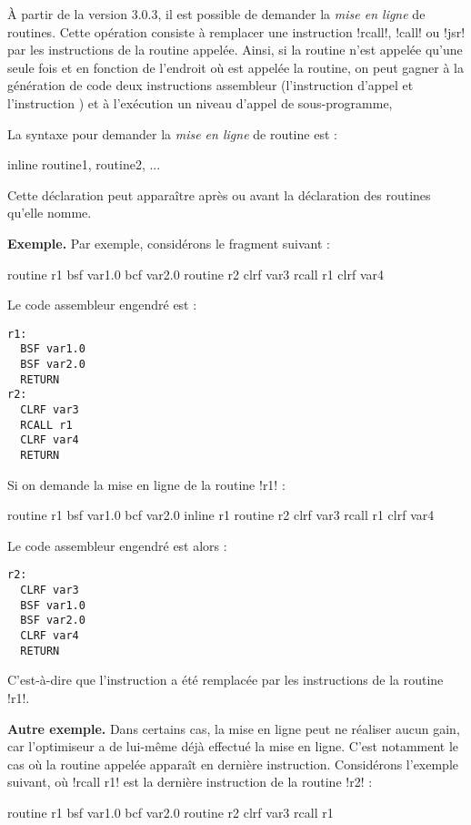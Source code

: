 
À partir de la version 3.0.3, il est possible de demander la \emph{mise en ligne} de routines. Cette opération consiste à remplacer une instruction \pic!rcall!, \pic!call! ou \pic!jsr! par les instructions de la routine appelée. Ainsi, si la routine n'est appelée qu'une seule fois et en fonction de l'endroit où est appelée la routine, on peut gagner à la génération de code deux instructions assembleur (l'instruction d'appel et l'instruction ) et à l'exécution un niveau d'appel de sous-programme, 

La syntaxe pour demander la \emph{mise en ligne} de routine est :
\begin{piccolo}
inline routine1, routine2, ...
\end{piccolo}

Cette déclaration peut apparaître après ou avant la déclaration des routines qu'elle nomme.

\textbf{Exemple.} Par exemple, considérons le fragment suivant :
\begin{piccolo}
routine r1 {
  bsf var1.0
  bcf var2.0
}
routine r2 {
  clrf var3
  rcall r1
  clrf var4
}
\end{piccolo}

Le code assembleur engendré est :
\begin{lstlisting}[language=assembleur]
r1:
  BSF var1.0
  BSF var2.0
  RETURN
r2:
  CLRF var3
  RCALL r1
  CLRF var4
  RETURN
\end{lstlisting}


Si on demande la mise en ligne de la routine \pic!r1! :
\begin{piccolo}
routine r1 {
  bsf var1.0
  bcf var2.0
}
inline r1
routine r2 {
  clrf var3
  rcall r1
  clrf var4
}
\end{piccolo}

Le code assembleur engendré est alors :
\begin{lstlisting}[language=assembleur]
r2:
  CLRF var3
  BSF var1.0
  BSF var2.0
  CLRF var4
  RETURN
\end{lstlisting}

C'est-à-dire que l'instruction  a été remplacée par les instructions de la routine \pic!r1!.

\textbf{Autre exemple.} Dans certains cas, la mise en ligne peut ne réaliser aucun gain, car l'optimiseur a de lui-même déjà effectué la mise en ligne. C'est notamment le cas où la routine appelée apparaît en dernière instruction. Considérons l'exemple suivant, où \pic!rcall r1! est la dernière instruction de la routine \pic!r2! :
\begin{piccolo}
routine r1 {
  bsf var1.0
  bcf var2.0
}
routine r2 {
  clrf var3
  rcall r1
}
\end{piccolo}

